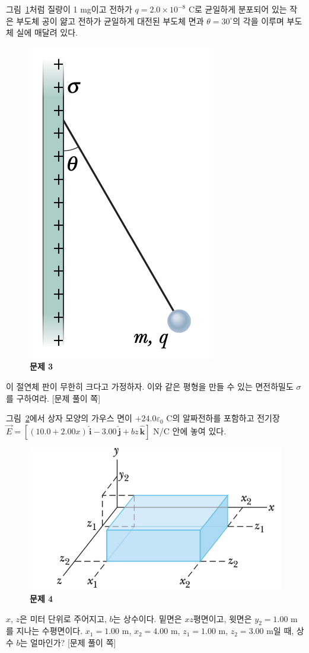 \documentclass[tightenlines,floatfix,nofootinbib,superscriptaddress,fleqn]{revtex4}
\begin{document}
 그림~\ref{fig:2}처럼 질량이 1 mg이고
전하가 $q=2.0\times 10^{-8}$ C로 균일하게 분포되어 있는 작은 부도체
공이 얆고 전하가 균일하게 대전된 부도체 면과 $\theta=30^\circ$의
각을 이루며 부도체 실에 매달려 있다.  
\begin{figure}[htp]
  \centering
  \includegraphics[scale=0.6]{qfig3-2.png}
  \caption{\textbf{문제 3}}
  \label{fig:2}
\end{figure}
이 절연체 판이 무한히 크다고 가정하자. 이와 같은 평형을 만들 수 있는
면전하밀도 $\sigma$를 구하여라. 
\newpage
{\color{gray} [문제 풀이 쪽]}
\newpage

 그림~\ref{fig:3}에서 상자 모양의 가우스
면이 $+24.0\varepsilon_0$ C의 알짜전하를 포함하고 전기장
$\vec{E}=[(10.0 + 2.00x)\,\hat{\bm{i}}-3.00\,\hat{\bm{j}}+
  bz\,\hat{\bm{k}}]$ N/C 안에 놓여 있다. 
\begin{figure}[htp]
  \centering
  \includegraphics[scale=0.6]{qfig3-3.png}
  \caption{\textbf{문제 4}}
  \label{fig:3}
\end{figure}
$x$, $z$은 미터 단위로
  주어지고, $b$는 상수이다. 밑면은 $xz$평면이고, 윗면은 $y_2=1.00$ m를
  지나는 수평면이다. $x_1=1.00$ m, $x_2=4.00$ m, $z_1= 1.00$ m,
  $z_2=3.00$ m일 때, 상수 $b$는 얼마인가?  
\newpage
{\color{gray} [문제 풀이 쪽]}
\newpage
\end{document}
